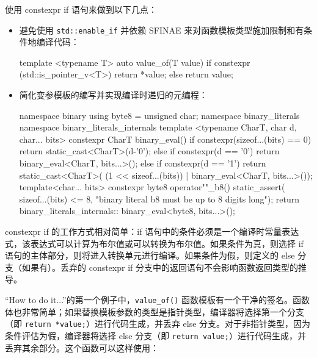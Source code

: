 
使用 constexpr if 语句来做到以下几点：

\begin{itemize}
\item
避免使用 \verb|std::enable_if| 并依赖 SFINAE 来对函数模板类型施加限制和有条件地编译代码：

\begin{cpp}
template <typename T>
auto value_of(T value)
{
    if constexpr (std::is_pointer_v<T>)
        return *value;
    else
        return value;
}
\end{cpp}

\item
简化变参模板的编写并实现编译时递归的元编程：

\begin{cpp}
namespace binary
{
    using byte8 = unsigned char;
    namespace binary_literals
    {
        namespace binary_literals_internals
        {
            template <typename CharT, char d, char... bits>
            constexpr CharT binary_eval()
            {
                if constexpr(sizeof...(bits) == 0)
                return static_cast<CharT>(d-'0');
                else if constexpr(d == '0')
                return binary_eval<CharT, bits...>();
                else if constexpr(d == '1')
                return static_cast<CharT>(
                (1 << sizeof...(bits)) |
                binary_eval<CharT, bits...>());
            }
        }
        template<char... bits>
        constexpr byte8 operator""_b8()
        {
            static_assert(
            sizeof...(bits) <= 8,
            "binary literal b8 must be up to 8 digits long");
            return binary_literals_internals::
            binary_eval<byte8, bits...>();
        }
    }
}
\end{cpp}
\end{itemize}


constexpr if 的工作方式相对简单：if 语句中的条件必须是一个编译时常量表达式，该表达式可以计算为布尔值或可以转换为布尔值。如果条件为真，则选择 if 语句的主体部分，则将进入转换单元进行编译。如果条件为假，则定义的 else 分支（如果有）。丢弃的 constexpr if 分支中的返回语句不会影响函数返回类型的推导。

“How to do it...”的第一个例子中，\verb|value_of()| 函数模板有一个干净的签名。函数体也非常简单；如果替换模板参数的类型是指针类型，编译器将选择第一个分支（即 \verb|return *value;|）进行代码生成，并丢弃 else 分支。对于非指针类型，因为条件评估为假，编译器将选择 else 分支（即 \verb|return value;|）进行代码生成，并丢弃其余部分。这个函数可以这样使用：

